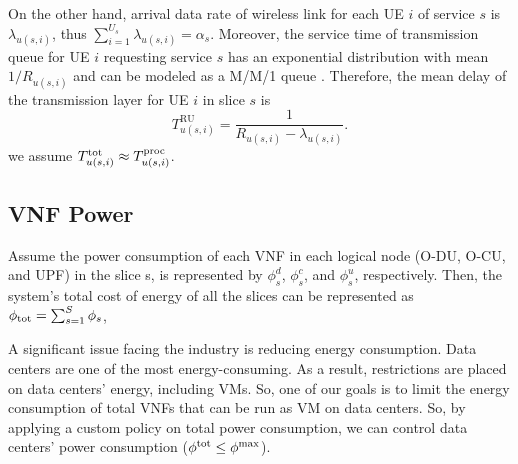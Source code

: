 \documentclass[lettersize,journal]{IEEEtran}
\begin{document}
On the other hand, arrival data rate of wireless link for each UE $i$ of service $s$ is $\lambda_{u(s,i)}$, thus $\sum_{i = 1}^{U_s} \lambda_{u(s,i)} = \alpha_s$.
Moreover, the service time of transmission queue for UE $i$ requesting service $s$ has
an exponential distribution with mean $1/R_{u(s,i)}$ and can be modeled as a M/M/1 queue \cite{SystemCostMinimization,luong2018joint,luong2018novel}.
Therefore, the mean delay of the transmission layer for UE $i$ in slice $s$ is
\begin{equation}
 T_{u(s,i)}^{\text{RU}} = \frac{1}{R_{u(s,i)} - \lambda_{u(s,i)}}.
\end{equation}
we assume $T^{\text{\text{tot}}}_{u(s,i)} \approx T^{\text{proc}}_{u(s,i)} $. %
\subsection{VNF Power}
Assume the power consumption of each VNF in each logical node (O-DU, O-CU, and UPF) in the slice s, is represented by $\phi_{s}^d$, $\phi_{s}^c$, and $\phi_{s}^u$, respectively.
Then, the system's total cost of energy of all the slices can be represented as $\textstyle \phi_{\text{\text{tot}}} = \sum_{s=1}^{S}\phi_{s}$,

A significant issue facing the industry is reducing energy consumption. Data centers are one of the most energy-consuming. As a result, restrictions are placed on data centers' energy, including VMs. So, one of our goals is to limit the energy consumption of total VNFs that can be run as VM on data centers. So, by applying a custom policy on total power consumption, we can control data centers' power consumption ($\phi^{\text{\text{tot}}}  \leq \phi^{\text{max}}$).
\end{document}
